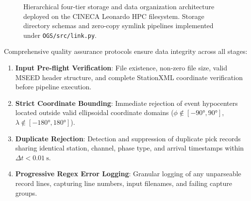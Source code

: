 \begin{figure}[htbp]
  \centering
  \caption{Hierarchical four-tier storage and data organization
    architecture deployed on the \ac{CINECA} Leonardo \ac{HPC}
    filesystem. Storage directory schemas and
  zero-copy symlink pipelines implemented under \texttt{OGS/src/link.py}.}
  \label{fig:storage_architecture}
\end{figure}

Comprehensive quality assurance protocols ensure data integrity
across all stages:
\begin{enumerate}
  \item \textbf{Input Pre-flight Verification}: File existence,
    non-zero file size, valid MSEED header structure, and complete
    StationXML coordinate verification before pipeline execution.
  \item \textbf{Strict Coordinate Bounding}: Immediate rejection
    of event hypocenters located outside valid ellipsoidal
    coordinate domains ($\phi \notin [\ang{-90}, \ang{90}]$, $\lambda
    \notin [\ang{-180}, \ang{180}]$).
  \item \textbf{Duplicate Rejection}: Detection and suppression of
    duplicate pick records sharing identical station, channel,
    phase type, and arrival timestamps within $\Delta t <
    \qty{0.01}{\second}$.
  \item \textbf{Progressive Regex Error Logging}: Granular logging
    of any unparseable record lines, capturing line numbers, input
    filenames, and failing capture groups.
\end{enumerate}
